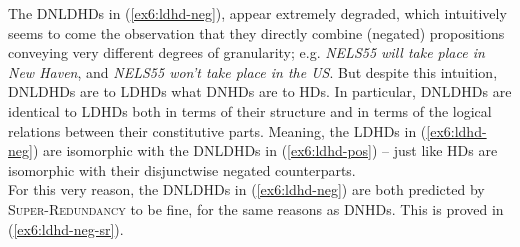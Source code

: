 \begin{exe}
	\ex\label{ex6:ldhd-neg}
	\begin{xlist}
		\label{ex6:ldhd-neg-ws}
		\label{ex6:ldhd-neg-sw}
	\end{xlist}
\end{exe}

The DNLDHDs in (\ref{ex6:ldhd-neg}), appear extremely degraded, which intuitively seems to come the observation that they directly combine (negated) propositions conveying very different degrees of granularity; e.g. \textit{NELS55 will take place in New Haven}, and \textit{NELS55 won't take place in the US}. But despite this intuition, DNLDHDs are to LDHDs what DNHDs are to HDs. In particular, DNLDHDs are identical to LDHDs both in terms of their structure and in terms of the logical relations between their constitutive parts. Meaning, the LDHDs in (\ref{ex6:ldhd-neg}) are isomorphic with the DNLDHDs in (\ref{ex6:ldhd-pos}) -- just like HDs are isomorphic with their disjunctwise negated counterparts.\\

For this very reason, the DNLDHDs in (\ref{ex6:ldhd-neg}) are both predicted by \textsc{Super-Redundancy} to be fine, for the same reasons as DNHDs. This is proved in (\ref{ex6:ldhd-neg-sr}).

